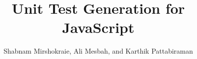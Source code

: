 \documentclass[times]{stvrauth}
\newcommand{\tool}{\textsc{JSeft}\xspace}
\begin{document}
\title{
Unit Test Generation for JavaScript
}


\author{Shabnam Mirshokraie, Ali Mesbah, and Karthik Pattabiraman}
\address{Department of Electrical and Computer Engineering, University of British Columbia, Vancouver, BC, Canada}





\maketitle










\balance
%




\end{document}
